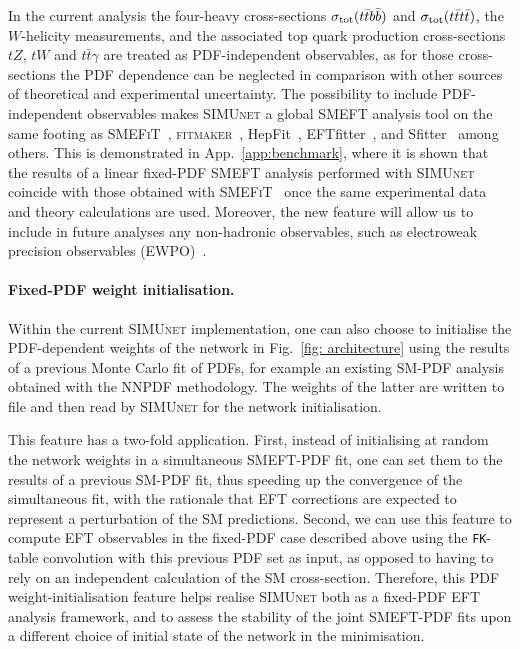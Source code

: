 \documentclass[withindex,glossary]{cam-thesis}
\newcommand{\simunet}{\textsc{SIMUnet}}
\newcommand{\fitm}{\textsc{fitmaker}}
\newcommand{\smefit}{\textsc{SMEFiT}}
\begin{document}
In the current analysis the four-heavy cross-sections $\sigma_{\rm tot}(t\bar{t}b\bar{b})$
and $\sigma_{\rm tot}(t\bar{t}t\bar{t})$, the $W$-helicity measurements,
and the associated top quark production cross-sections $tZ$, $tW$ and
$t\bar{t}\gamma$ are treated as PDF-independent observables, as
 for those cross-sections the PDF dependence can be neglected
in comparison with other sources of theoretical and experimental
uncertainty. 
%
%
%
The possibility to include PDF-independent observables makes \simunet{} a global SMEFT analysis tool 
on the same footing as \smefit~\cite{Hartland:2019bjb,Giani:2023gfq}, \fitm~\cite{Ellis:2020unq},
{\sc\small HepFit}~\cite{DeBlas:2019ehy}, {\sc\small EFTfitter}~\cite{Castro:2016jjv},
and {\sc\small Sfitter}~\cite{Brivio:2019ius} among others. This is
demonstrated in App.~\ref{app:benchmark}, where it is shown that the
results of a linear fixed-PDF SMEFT analysis
performed with \simunet{} coincide with those obtained with
\smefit~\cite{Giani:2023gfq} once the same
experimental data and theory calculations are used. 
%
Moreover, the new feature will allow us to include in future analyses any non-hadronic
observables, such as electroweak precision observables (EWPO)~\cite{Han:2004az}. 
%


\paragraph{Fixed-PDF weight initialisation.}
%
Within the current  \simunet{} implementation, one can also choose to initialise
the PDF-dependent weights of the network in Fig.~\ref{fig: architecture}
using the results of a previous Monte Carlo fit of PDFs, for example
an existing SM-PDF analysis obtained with the NNPDF methodology.
%
The weights of the latter are written to file and then read by  \simunet{} for the network
initialisation.

This feature has a two-fold application.
%
First, instead of initialising at random the network weights in a
simultaneous SMEFT-PDF fit,
one can set them to the results of a previous SM-PDF fit, thus
speeding up the convergence of the simultaneous fit, with the rationale that
EFT corrections are expected to represent a perturbation of the SM predictions.
%
Second, we can use this feature to compute EFT observables in the fixed-PDF case
described above using the {\tt FK}-table convolution with this previous PDF set as input,
as opposed to having to rely on an independent calculation of the SM cross-section.
%
Therefore, this PDF weight-initialisation feature helps realise
\simunet{} both as a fixed-PDF EFT analysis framework, and to assess the stability of the
joint SMEFT-PDF fits upon a different choice of initial state of the network
in the minimisation.
\end{document}
